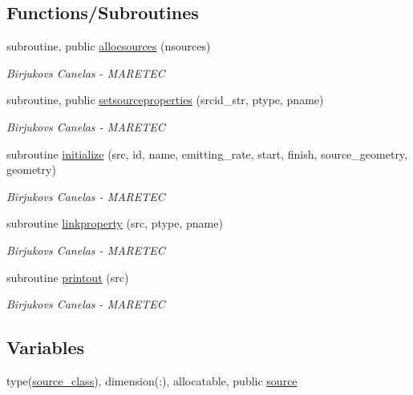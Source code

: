 \subsection*{Functions/\+Subroutines}
\begin{DoxyCompactItemize}
\item 
subroutine, public \hyperlink{namespacesource__identity_a716b4cb4acec5756a6d4dcf20eee588e}{allocsources} (nsources)
\begin{DoxyCompactList}\small\item\em Birjukovs Canelas -\/ M\+A\+R\+E\+T\+EC \end{DoxyCompactList}\item 
subroutine, public \hyperlink{namespacesource__identity_a8b07a03d4f79249743896163e9c85f55}{setsourceproperties} (srcid\+\_\+str, ptype, pname)
\begin{DoxyCompactList}\small\item\em Birjukovs Canelas -\/ M\+A\+R\+E\+T\+EC \end{DoxyCompactList}\item 
subroutine \hyperlink{namespacesource__identity_a8d7aaa58c575f6ed78f5ca29d64615d7}{initialize} (src, id, name, emitting\+\_\+rate, start, finish, source\+\_\+geometry, geometry)
\begin{DoxyCompactList}\small\item\em Birjukovs Canelas -\/ M\+A\+R\+E\+T\+EC \end{DoxyCompactList}\item 
subroutine \hyperlink{namespacesource__identity_a43fd5b86e85ddeadf982708445286e26}{linkproperty} (src, ptype, pname)
\begin{DoxyCompactList}\small\item\em Birjukovs Canelas -\/ M\+A\+R\+E\+T\+EC \end{DoxyCompactList}\item 
subroutine \hyperlink{namespacesource__identity_a9715a7d707b4c80aa2d2ebd08712f6a9}{printout} (src)
\begin{DoxyCompactList}\small\item\em Birjukovs Canelas -\/ M\+A\+R\+E\+T\+EC \end{DoxyCompactList}\end{DoxyCompactItemize}
\subsection*{Variables}
\begin{DoxyCompactItemize}
\item 
type(\hyperlink{structsource__identity_1_1source__class}{source\+\_\+class}), dimension(\+:), allocatable, public \hyperlink{namespacesource__identity_a5ed8006613af7461c6a2ff1cdaeb8f0f}{source}
\end{DoxyCompactItemize}


